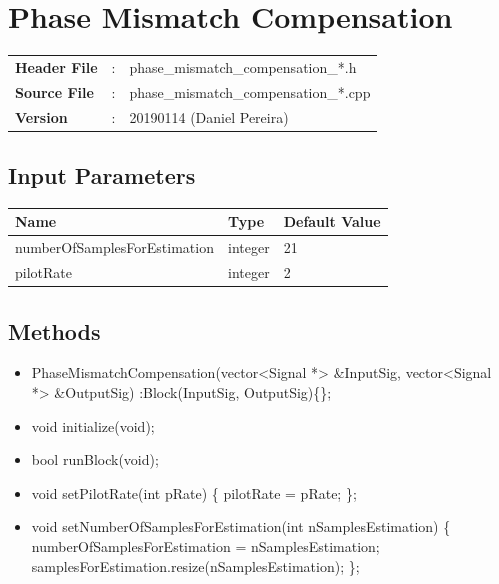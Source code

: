 \clearpage

\section{Phase Mismatch Compensation}
\label{sec:phase_mismatch_compensation}
\begin{refsection}

\begin{tcolorbox}	
\begin{tabular}{p{2.75cm} p{0.2cm} p{10.5cm}} 	
\textbf{Header File}    &:& phase\_mismatch\_compensation\_*.h \\
\textbf{Source File}    &:& phase\_mismatch\_compensation\_*.cpp \\
\textbf{Version}        &:& 20190114 (Daniel Pereira)
\end{tabular}
\end{tcolorbox}

\subsection*{Input Parameters}

\begin{table}[H]
\centering
\begin{tabular}{|l|l|l|}
\hline
Name                         & Type           & Default Value \\ \hline
numberOfSamplesForEstimation & integer        & 21            \\ \hline
pilotRate                    & integer        & 2             \\ \hline
\end{tabular}
\end{table}


\subsection*{Methods}

\begin{itemize}
  \item PhaseMismatchCompensation(vector<Signal *> \&InputSig, vector<Signal *> \&OutputSig) :Block(InputSig, OutputSig)\{\};
  \item void initialize(void);
  \item bool runBlock(void);
  \item void setPilotRate(int pRate) \{ pilotRate = pRate; \};
  \item void setNumberOfSamplesForEstimation(int nSamplesEstimation) \{ numberOfSamplesForEstimation = nSamplesEstimation; samplesForEstimation.resize(nSamplesEstimation); \};
\end{itemize}





\end{refsection}
